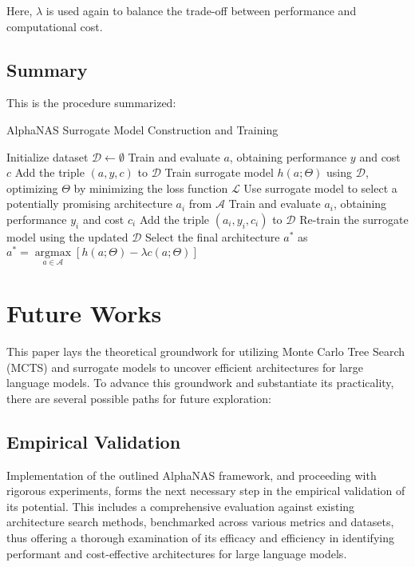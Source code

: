 \documentclass{article}
\begin{document}
Here, $\lambda$ is used again to balance the trade-off between performance and computational cost.

\subsection{Summary}

This is the procedure summarized:

\begin{algorithm}
\caption{AlphaNAS Surrogate Model Construction and Training}
\begin{algorithmic}[1]
\STATE Initialize dataset $\mathcal{D} \leftarrow \emptyset$
    \STATE Train and evaluate $a$, obtaining performance $y$ and cost $c$
    \STATE Add the triple $(a, y, c)$ to $\mathcal{D}$
\ENDFOR
\STATE Train surrogate model $h(a;\Theta)$ using $\mathcal{D}$, optimizing $\Theta$ by minimizing the loss function $\mathcal{L}$
    \STATE Use surrogate model to select a potentially promising architecture $a_i$ from $\mathcal{A}$
    \STATE Train and evaluate $a_i$, obtaining performance $y_i$ and cost $c_i$
    \STATE Add the triple $(a_i, y_i, c_i)$ to $\mathcal{D}$
    \STATE Re-train the surrogate model using the updated $\mathcal{D}$
\ENDWHILE
\STATE Select the final architecture $a^*$ as $a^* = \underset{a \in \mathcal{A}}{\operatorname{argmax}} [h(a;\Theta) - \lambda c(a;\Theta)]$
\end{algorithmic}
\end{algorithm}

\section{Future Works}

This paper lays the theoretical groundwork for utilizing Monte Carlo Tree Search (MCTS) and surrogate models to uncover efficient architectures for large language models. To advance this groundwork and substantiate its practicality, there are several possible paths for future exploration:

\subsection{Empirical Validation}

Implementation of the outlined AlphaNAS framework, and proceeding with rigorous experiments, forms the next necessary step in the empirical validation of its potential. This includes a comprehensive evaluation against existing architecture search methods, benchmarked across various metrics and datasets, thus offering a thorough examination of its efficacy and efficiency in identifying performant and cost-effective architectures for large language models.
\end{document}
